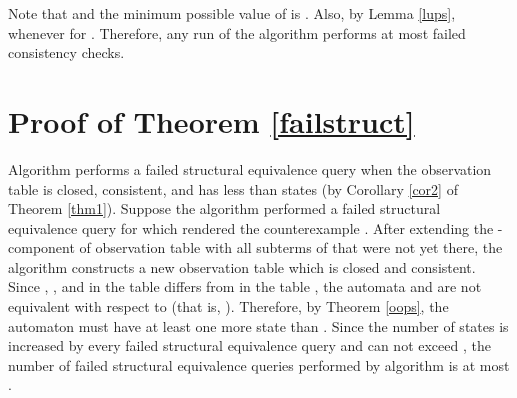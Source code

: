 \documentclass[preprint,12pt,english]{article}
\begin{document}
Note that  and the minimum possible value of  is .  Also, by Lemma \ref{lups},  whenever  for . Therefore, any run of the algorithm performs at most 
failed consistency checks. 
\section{Proof of Theorem \ref{failstruct}}
Algorithm  performs a failed structural equivalence query when the observation table  is closed, consistent, and has less than  states (by Corollary \ref{cor2} of Theorem \ref{thm1}). Suppose the algorithm performed a 
 failed structural equivalence query for  which rendered the counterexample . After extending the -component of observation table  with all subterms of  that were not yet there, the algorithm constructs a new observation table  which is closed and consistent. Since , , and  in the table  differs from  in the table , the automata  and  are not equivalent with respect to  (that is, ). Therefore, by Theorem \ref{oops}, the automaton  must have at least one more state than 
. Since the number of states is increased by every failed structural equivalence query and can not exceed , the number of failed structural equivalence queries performed by algorithm  is at most . 
\end{document}
